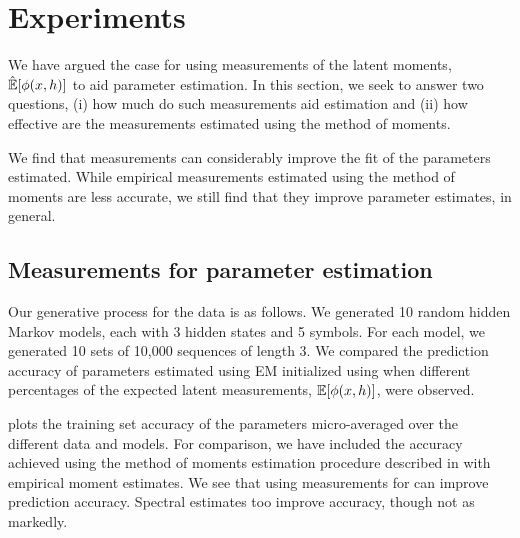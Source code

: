 \section{Experiments} \label{sec:experiments}

We have argued the case for using measurements of the latent moments,
$\hat{\mathbb{E}}[\phi(x,h)]$ to aid parameter estimation. In this section, we
seek to answer two questions, 
(i) how much do such measurements aid
estimation and 
(ii) how effective are the measurements estimated using the
method of moments.

We find that measurements can considerably improve the fit of the
parameters estimated. 
While empirical measurements estimated using the
method of moments are less accurate, we still find that they improve
parameter estimates, in general.

\subsection{Measurements for parameter estimation}

Our generative process for the data is as follows.
We generated 10 random hidden Markov models, each with 3 hidden states and 5 symbols. 
For each model, we generated 10 sets of 10,000 sequences of length 3.
We compared the prediction accuracy of parameters estimated using EM initialized using  when different percentages of the expected latent measurements, $\mathbb{E}[\phi(x,h)]$, were observed. 


 plots the training set accuracy of the parameters micro-averaged over the different data and models.
For comparison, we have included the accuracy achieved using the method of moments estimation procedure described in  with empirical moment estimates. 
We see that using measurements for can improve prediction accuracy. Spectral estimates too improve accuracy, though not as markedly.


